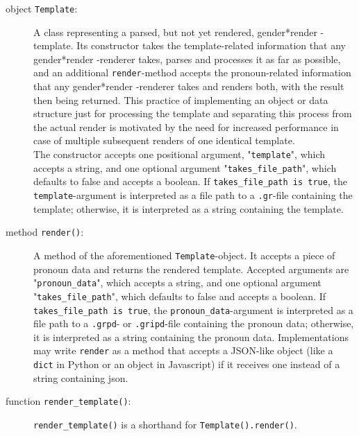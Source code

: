 \documentclass{article}
\newcommand{\GenderRender}{
    gender*render
}
\begin{document}
    \begin{description}
        \item[object \texttt{Template}:] A class representing a parsed, but not yet rendered, \GenderRender-template.
                                         Its constructor takes the template-related information that any \GenderRender-renderer takes, parses and processes it as far as possible, and an additional \texttt{render}-method accepts the pronoun-related information that any \GenderRender-renderer takes and renders both, with the result then being returned.
                                         This practice of implementing an object or data structure just for processing the template and separating this process from the actual render is motivated by the need for increased performance in case of multiple subsequent renders of one identical template.\\
                                         The constructor accepts one positional argument, "\texttt{template}", which accepts a string, and one optional argument "\texttt{takes\_file\_path}", which defaults to false and accepts a boolean.
                                         If \texttt{takes\_file\_path is true}, the \texttt{template}-argument is interpreted as a file path to a \texttt{.gr}-file containing the template;
                                         otherwise, it is interpreted as a string containing the template.
        \item[method \texttt{render()}:] A method of the aforementioned \texttt{Template}-object.
                                        It accepts a piece of pronoun data and returns the rendered template.
                                        Accepted arguments are "\texttt{pronoun\_data}", which accepts a string, and one optional argument "\texttt{takes\_file\_path}", which defaults to false and accepts a boolean.
                                        If \texttt{takes\_file\_path is true}, the \texttt{pronoun\_data}-argument is interpreted as a file path to a \texttt{.grpd}- or \texttt{.gripd}-file containing the pronoun data;
                                        otherwise, it is interpreted as a string containing the pronoun data.
                                        Implementations may write \texttt{render} as a method that accepts a JSON-like object (like a \texttt{dict} in Python or an object in Javascript) if it receives one instead of a string containing json.
        \item[function \texttt{render\_template()}:] \texttt{render\_template()} is a shorthand for \texttt{Template().render()}.

\end{description}
\end{document}
